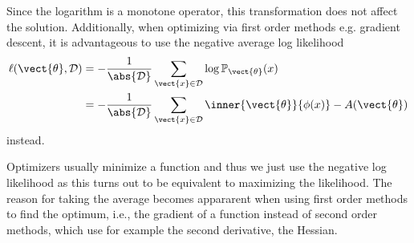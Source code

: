     Since the logarithm is a monotone operator, this transformation does not affect the solution.
    Additionally, when optimizing via first order methods e.g. gradient descent, it is advantageous to use the negative average log likelihood
    \begin{equation}
        \label{eq:likelihood:expfam}
        \begin{split}
        \ell(\vect{\theta}, \mathcal{D}) &= - \frac{1}{\abs{\mathcal{D}}} \sum_{\vect{x} \in \mathcal{D}} \log \mathbb{P}_{\vect{\theta}}(x)\\
        &= - \frac{1}{\abs{\mathcal{D}}} \sum_{\vect{x} \in \mathcal{D}} \inner{\vect{\theta}}{\phi(x)} - A(\vect{\theta})
    \end{split}
    \end{equation}
    instead.

    Optimizers usually minimize a function and thus we just use the negative log likelihood as this turns out to be equivalent to maximizing the likelihood.
    The reason for taking the average becomes appararent when using first order methods to find the optimum, i.e., the gradient of a function instead of second order methods, which use for example the second derivative, the Hessian.


